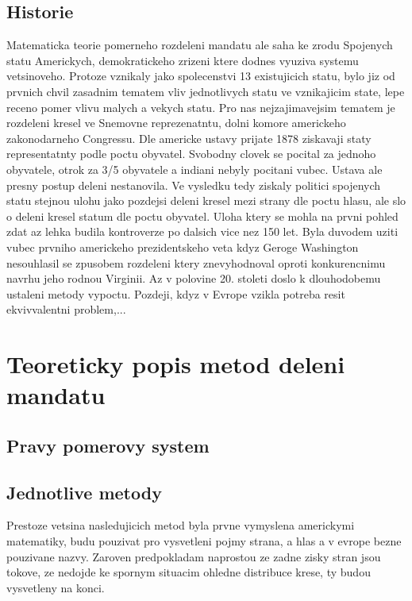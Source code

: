 \documentclass[12pt,a4paper]{report}
\begin{document}
\section{Historie}
Matematicka teorie pomerneho rozdeleni mandatu ale saha ke zrodu Spojenych statu Americkych, demokratickeho zrizeni ktere dodnes vyuziva systemu vetsinoveho.\autocite{BAL2}
Protoze vznikaly jako spolecenstvi 13 existujicich statu, bylo jiz od prvnich chvil zasadnim tematem vliv jednotlivych statu ve vznikajicim state, lepe receno pomer vlivu malych a vekych statu.
Pro nas nejzajimavejsim tematem je rozdeleni kresel ve Snemovne reprezenatntu, dolni komore americkeho zakonodarneho Congressu.
Dle americke ustavy prijate 1878 ziskavaji staty representatnty podle poctu obyvatel.
Svobodny clovek se pocital za jednoho obyvatele, otrok za 3/5 obyvatele a indiani nebyly pocitani vubec.
Ustava ale presny postup deleni nestanovila.
Ve vysledku tedy ziskaly politici spojenych statu stejnou ulohu jako pozdejsi deleni kresel mezi strany dle poctu hlasu, ale slo o deleni kresel statum dle poctu obyvatel. 
Uloha ktery se mohla na prvni pohled zdat az lehka budila kontroverze po dalsich vice nez 150 let.
Byla duvodem uziti vubec prvniho americkeho prezidentskeho veta kdyz Geroge Washington nesouhlasil se zpusobem rozdeleni ktery znevyhodnoval oproti konkurencnimu navrhu jeho rodnou Virginii.
Az v polovine 20. stoleti doslo k dlouhodobemu ustaleni metody vypoctu.
Pozdeji, kdyz v Evrope vzikla potreba resit ekvivvalentni problem,...

\chapter{Teoreticky popis metod deleni mandatu}

\section{Pravy pomerovy system} %

\section{Jednotlive metody}
Prestoze vetsina nasledujicich metod byla prvne vymyslena americkymi matematiky, budu pouzivat pro vysvetleni pojmy strana, a hlas a v evrope bezne pouzivane nazvy.
Zaroven predpokladam naprostou ze zadne zisky stran jsou tokove, ze nedojde ke spornym situacim ohledne distribuce krese, ty budou vysvetleny na konci. 
\end{document}
